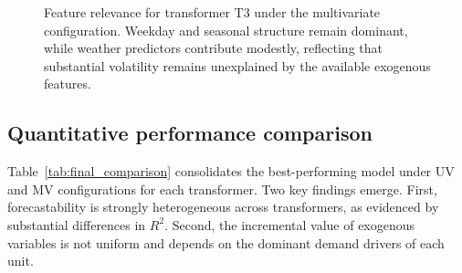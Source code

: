 \begin{figure}[t]
\centering
\begin{subfigure}[t]{0.32\textwidth}
    \centering
    
\end{subfigure}
\begin{subfigure}[t]{0.32\textwidth}
    \centering
    
\end{subfigure}
\begin{subfigure}[t]{0.32\textwidth}
    \centering
    
\end{subfigure}
\caption{Feature relevance for transformer T3 under the multivariate configuration. Weekday and seasonal structure remain dominant, while weather predictors contribute modestly, reflecting that substantial volatility remains unexplained by the available exogenous features.}
\label{fig:importance_T70a}
\end{figure}

\subsection{Quantitative performance comparison}
\label{subsec:results_quantitative}

Table~\ref{tab:final_comparison} consolidates the best-performing model under UV and MV configurations for each transformer. Two key findings emerge. First, forecastability is strongly heterogeneous across transformers, as evidenced by substantial differences in $R^2$. Second, the incremental value of exogenous variables is not uniform and depends on the dominant demand drivers of each unit.

